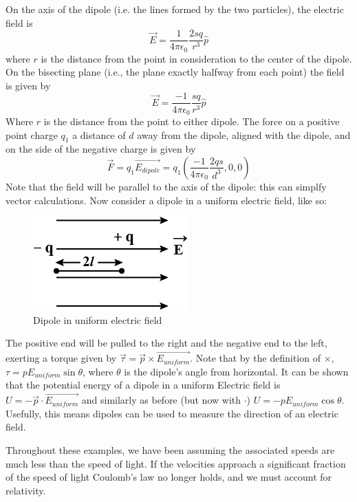 \documentclass[nobib]{tufte-handout}
\begin{document}
On the axis of the dipole (i.e. the lines
formed by the two particles), the electric field is 
\[\vec{E} = \frac{1}{4\pi \epsilon_0}\frac{2sq}{r^3}\hat{p}\]
where $r$ is the distance from the point in consideration to the
center of the dipole.
On the bisecting plane (i.e., the plane exactly halfway from each 
point) the field is given by
\[\vec{E} = \frac{-1}{4 \pi \epsilon_0}\frac{sq}{r^3}\hat{p}\]
Where $r$ is the distance from the point to either dipole.
The force on a positive point charge $q_1$ a 
distance of $d$ away from the dipole, aligned with the dipole, and 
on the side of the negative charge is given by 
\[\vec{F}=q_1\vec{E_{dipole}}=q_1(\frac{-1}{4\pi \epsilon_0}\frac{2qs}{d^3},0,0)\]
Note that the field will be parallel to the axis of the dipole: this 
can simplfy vector calculations.
Now consider a dipole in a uniform electric field, like so:
\begin{figure}
    \caption{Dipole in uniform electric field}
    \center
    \includegraphics[width=\textwidth /2]{images/dipoleinuniformelectricfield.png}
\end{figure}
The positive end will be pulled to the right and the negative 
end to the left, exerting a torque given by $\vec{\tau} = \vec{p} \times \vec{E_{uniform}}$.
Note that by the definition of $\times$, $\tau = p E_{uniform} \sin{\theta}$, where $\theta$ is the
dipole's angle from horizontal. It can be shown that the potential
energy of a dipole in a uniform Electric field is $U = -\vec{p} \cdot \vec{E_{uniform}}$
and similarly as before (but now with $\cdot$) $U = -p E_{uniform} \cos{\theta}$. Usefully,
this means dipoles can be used to measure the direction of an electric field. 

Throughout these examples, we have been assuming the associated 
speeds are much less than the speed of light. If the velocities
approach a significant fraction of the speed of light Coulomb's
law no longer holds, and we must account for relativity. 
\end{document}
